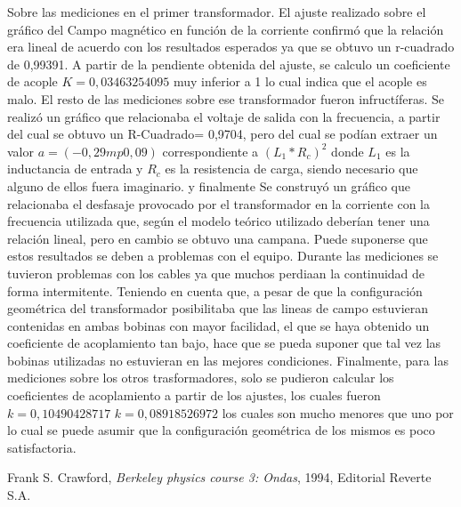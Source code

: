 \documentclass[11pt,a4paper]{article}
\begin{document}
Sobre las mediciones en el primer transformador. El ajuste realizado sobre el gráfico del Campo magnético en función de la corriente confirmó que la relación era lineal de acuerdo con los resultados esperados ya que se obtuvo un r-cuadrado de 0,99391. A partir de la pendiente obtenida del ajuste, se calculo un coeficiente de acople $K = 0,03463254095$ muy inferior a 1 lo cual indica que el acople es malo. El resto de las mediciones sobre ese transformador fueron infructíferas. Se realizó un gráfico que relacionaba el voltaje de salida con la frecuencia, a partir del cual se obtuvo un R-Cuadrado= 0,9704, pero del cual se podían extraer un valor   $a = (-0,29 mp 0,09)$ correspondiente a $(L_{1}*R_{c})^2$ donde $L_{1}$ es la inductancia de entrada y $R_{c}$ es la resistencia de carga, siendo necesario que alguno de ellos fuera imaginario. y finalmente Se construyó un gráfico que relacionaba el desfasaje provocado por el transformador en la corriente con la frecuencia utilizada que, según el modelo teórico utilizado deberían tener una relación lineal, pero en cambio se obtuvo una campana. Puede suponerse que estos resultados se deben a problemas con el equipo. Durante las mediciones se tuvieron problemas con los cables ya que muchos perdiaan la continuidad de forma intermitente. Teniendo en cuenta que, a pesar de que la configuración geométrica del transformador posibilitaba que las lineas de campo estuvieran contenidas en ambas bobinas con mayor facilidad, el que se haya obtenido un coeficiente de acoplamiento tan bajo, hace que se pueda suponer que tal vez las bobinas utilizadas no estuvieran en las mejores condiciones.
Finalmente, para las mediciones sobre los otros trasformadores, solo se pudieron calcular los coeficientes de acoplamiento a partir de los ajustes, los cuales fueron $k = 0,10490428717$  $k = 0,08918526972$ los cuales son mucho menores que uno por lo cual se puede asumir que la configuración geométrica de los mismos es poco satisfactoria.









\begin{thebibliography}{1}
  Frank S. Crawford, \textit{Berkeley physics course 3: Ondas}, 1994, Editorial Reverte S.A.
\end{thebibliography}
 
\end{document}
